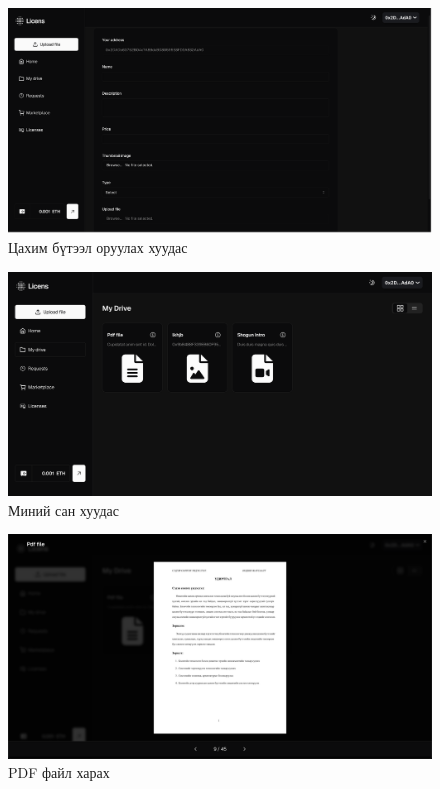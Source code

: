\begin{figure}[h!]
	\centering
	\includegraphics[scale=0.15]{src/images/upload.png}
	\caption{Цахим бүтээл оруулах хуудас}
\end{figure}

\begin{figure}[h!]
	\centering
	\includegraphics[scale=0.16]{src/images/drive.png}
	\caption{Миний сан хуудас}
\end{figure}

\begin{figure}[h!]
	\centering
	\includegraphics[scale=0.16]{src/images/pdf-viewer.png}
	\caption{PDF файл харах}
\end{figure}

